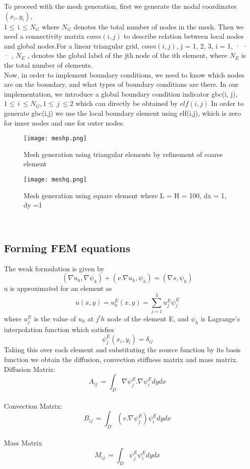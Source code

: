 \documentclass[9pt]{article}
\begin{document}
To proceed with the mesh generation, first we generate the nodal coordinates $(x_i,y_i)$,\\ 1$\leq$\,i\,$\leq N_G$ 
where $N_G$ denotes the total number of nodes in the mesh. Then we need a connectivity matrix $conn(i,j)$ to describe relation between local nodes and global nodes.For a linear triangular grid, $conn(i,j)$, j = 1, 2, 3, i = 1, · · · , $N_E$ ,
denotes the global label of the jth node of the ith element, where $N_E$ is the
total number of elements.\\
Now, in order to implement boundary conditions, we need to know which nodes are on
the boundary, and what types of boundary conditions are there. In our implementation, we introduce a global boundary condition indicator gbc(i, j), $1\leq \,i\, \leq N_G, 1\leq \,j\, \leq 2 $ which can directly be obtained by $elf(i,j)$
In order to generate gbc(i,j) we use the local boundary element using elf(i,j), which is zero for inner nodes and one for outer nodes.
\begin{figure}[!h]
    	\centering
    	\begin{minipage}[t]{4cm}
    		
    		\texttt{[image: meshp.png]}
    		\caption{Mesh generation using triangular elements by refinement of coarse element}
    	\end{minipage}
    	\hspace{5cm}
    	\begin{minipage}[t]{4cm}
    		
    		\texttt{[image: meshq.png]}
    		\caption{Mesh generation using square element where L = H = 100, dx = 1, dy =1}
    	\end{minipage}
    \end{figure} 
\\
\newpage
\subsection{Forming FEM equations}
The weak formulation is given by
\[
(\nabla u_h,\nabla \psi_h) + (v.\nabla u_h, \psi_h) = (\nabla s,  \psi_h)
\]
u is approximated for an element as
\[
u(x,y) = u_h^E(x,y) = \sum_{j = 1}^{3} u_j^E\psi_j^E
\]
where $u_j^E$ is the value of $u_h$ at $j^th$ node of the element E, and $\psi_h$ is Lagrange's interpolation function which satisfies
\[
\psi_j^E(x_i,y_i) = \delta_{ij}
\]
Taking this over each element and substituting the source function by its basis function we obtain the diffusion, convection stiffness matrix and mass matrix.
\\Diffusion Matrix:
\[
A_{ij}\, =  \int_{D} {\nabla \psi_j^E.\nabla \psi_i^E}{dy}{dx}
\] 
\\Convection Matrix:
\[
B_{ij}\, =  \int_{D} {(v.\nabla \psi_j^E)\psi_i^E}{dy}{dx}
\]
\\Mass Matrix
\[
M_{ij}\, =  \int_{D} { \psi_j^E \psi_i^E}{dy}{dx}
\]
\end{document}
